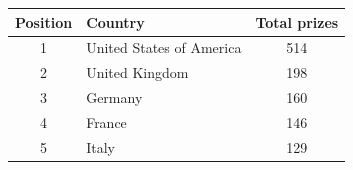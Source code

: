 \documentclass{article}
\begin{document}
\begin{itemize}
\begin{itemize}
        \vspace{0.5cm}
        \hspace{2cm}
        \begin{tabular}{|c|l|c|}
          \hline
          \textbf{Position} & \textbf{Country} & \textbf{Total prizes} \\
          \hline
          1 & United States of America & 514 \\
          \hline
          2 & United Kingdom & 198 \\
          \hline
          3 & Germany & 160 \\
          \hline
          4 & France & 146 \\
          \hline
          5 & Italy & 129 \\
          \hline
        \end{tabular}
    \end{itemize}
    
\end{itemize}
\end{document}
